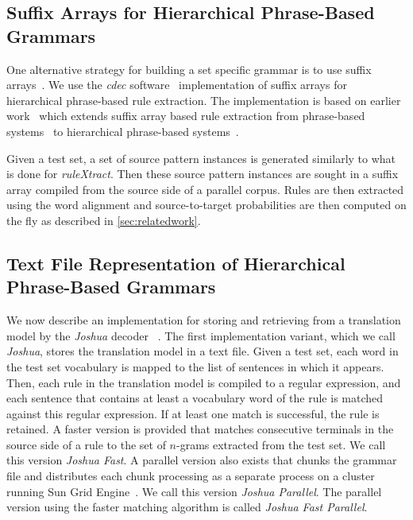 \subsection{Suffix Arrays for Hierarchical Phrase-Based Grammars}

One alternative strategy for building a set specific grammar is to use
suffix arrays~\citep{manber-myers:1990:SIAM,callisonburch-bannard-schroeder:2005:ACL,zhang-vogel:2005:EAMT,lopez:2007:EMNLP-CoNLL}. We use the \emph{cdec}
software~\citep{dyer-lopez-ganitkevitch-weese-ture-blunsom-setiawan-eidelman-resnik:2010:ACL} implementation of suffix arrays for
hierarchical phrase-based rule extraction. The implementation is based on
earlier work~\citep{lopez:2007:EMNLP-CoNLL} which extends suffix array based
rule extraction from phrase-based systems~\citep{callisonburch-bannard-schroeder:2005:ACL,zhang-vogel:2005:EAMT} to hierarchical phrase-based systems~\citep{lopez:2007:EMNLP-CoNLL}.

Given a test set, a set of source pattern instances is generated similarly to
what is done for \emph{ruleXtract}. Then these source pattern instances are
sought in a suffix array compiled from the source side of a parallel corpus.
Rules are then extracted using the word alignment and source-to-target
probabilities are then computed on the fly as described in \autoref{sec:relatedwork}.

\subsection{Text File Representation of Hierarchical Phrase-Based Grammars}

We now describe an implementation for storing and retrieving from a translation
model by the \emph{Joshua}
decoder~ \citep{weese-ganitkevitch-callisonburch-post-lopez:2011:WMT}.
The first implementation variant, which we call \emph{Joshua}, stores the
translation model in a text file. Given a test set, each word in the test set
vocabulary is mapped to the list of sentences in which it appears. Then, each
rule in the translation model is compiled to a regular expression, and each
sentence that contains at least a vocabulary word of the rule is matched against
this regular expression. If at least one match is successful, the rule is
retained. A faster version is provided that matches consecutive terminals in the
source side of a rule to the set of $n$-grams extracted from the test set. We
call this version \emph{Joshua Fast}. A parallel version also exists that chunks
the grammar file and distributes each chunk processing as a separate process on
a cluster running Sun Grid Engine~\citep{gentzsch:2001:CCG}. We call this
version \emph{Joshua Parallel}. The parallel version using the faster matching
algorithm is called \emph{Joshua Fast Parallel}.

